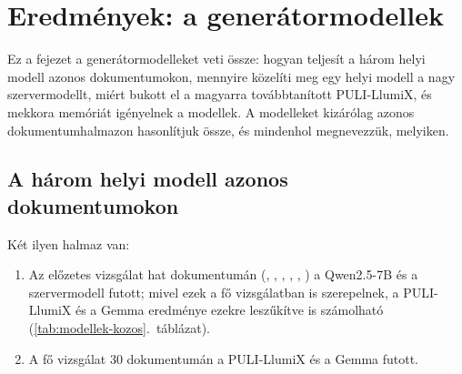 \chapter{Eredmények: a generátormodellek}
\label{ch:modellek}

Ez a fejezet a generátormodelleket veti össze: hogyan teljesít a három helyi modell azonos dokumentumokon,
mennyire közelíti meg egy helyi modell a nagy szervermodellt, miért bukott el a magyarra továbbtanított
PULI-LlumiX, és mekkora memóriát igényelnek a modellek. A modelleket kizárólag azonos dokumentumhalmazon
hasonlítjuk össze, és mindenhol megnevezzük, melyiken.

\section{A három helyi modell azonos dokumentumokon}
\label{sec:modellek-kozos}

\begin{sloppypar}
Két ilyen halmaz van:
\begin{enumerate}[label=(\alph*),leftmargin=*,itemsep=1pt,topsep=2pt]
\item Az előzetes vizsgálat hat dokumentumán (,
, , , ,
) a Qwen2.5-7B és a szervermodell futott; mivel ezek a fő vizsgálatban is szerepelnek, a
PULI-LlumiX és a Gemma eredménye ezekre leszűkítve is számolható (\ref{tab:modellek-kozos}.~táblázat).
\item A fő vizsgálat 30 dokumentumán a PULI-LlumiX és a Gemma futott.
\end{enumerate}
\end{sloppypar}


